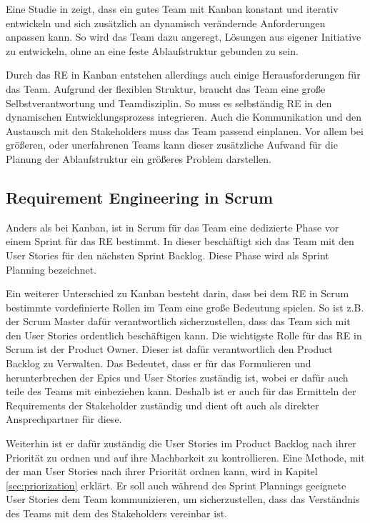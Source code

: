 \documentclass[acmtog]{acmart}
\begin{document}
Eine Studie in \cite{agileprocesses} zeigt, dass ein gutes Team mit Kanban konstant und iterativ entwickeln und sich zusätzlich 
an dynamisch verändernde Anforderungen anpassen kann. So wird das Team dazu angeregt, Lösungen aus eigener 
Initiative zu entwickeln, ohne an eine feste Ablaufstruktur gebunden zu sein. \cite{reqkanban}

Durch das RE in Kanban entstehen allerdings auch einige Herausforderungen für das Team. Aufgrund der flexiblen 
Struktur, braucht das Team eine große Selbstverantwortung und Teamdisziplin. So muss es selbständig RE in den 
dynamischen Entwicklungsprozess integrieren. Auch die Kommunikation und den Austausch mit den Stakeholders muss 
das Team passend einplanen. Vor allem bei größeren, oder unerfahrenen Teams kann dieser zusätzliche Aufwand für 
die Planung der Ablaufstruktur ein größeres Problem darstellen. \cite{kanbannod}

\subsection{Requirement Engineering in Scrum}

Anders als bei Kanban, ist in Scrum für das Team eine dedizierte Phase vor einem Sprint für das RE bestimmt. In dieser 
beschäftigt sich das Team mit den User Stories für den nächsten Sprint Backlog. Diese Phase wird als Sprint Planning bezeichnet. \cite{reinscrum}

Ein weiterer Unterschied zu Kanban besteht darin, dass bei dem RE in Scrum bestimmte vordefinierte Rollen im Team eine 
große Bedeutung spielen. So ist z.B. der Scrum Master dafür verantwortlich sicherzustellen, dass das Team sich mit den 
User Stories ordentlich beschäftigen kann. Die wichtigste Rolle für das RE in Scrum ist der Product Owner. Dieser ist 
dafür verantwortlich den Product Backlog zu Verwalten. Das Bedeutet, dass er für das Formulieren und herunterbrechen der 
Epics und User Stories zuständig ist, wobei er dafür auch teile des Teams mit einbeziehen kann. Deshalb ist er auch für 
das Ermitteln der Requirements der Stakeholder zuständig und dient oft auch als direkter Ansprechpartner für diese. \cite{reinscrum}

Weiterhin ist er dafür zuständig die User Stories im Product Backlog nach ihrer Priorität zu ordnen und auf ihre Machbarkeit 
zu kontrollieren. Eine Methode, mit der man User Stories nach ihrer Priorität ordnen kann, wird in Kapitel \ref{sec:priorization} erklärt. 
Er soll auch während des Sprint Plannings geeignete User Stories dem Team kommunizieren, um sicherzustellen, dass das Verständnis 
des Teams mit dem des Stakeholders vereinbar ist. \cite{reinscrum}
\end{document}
